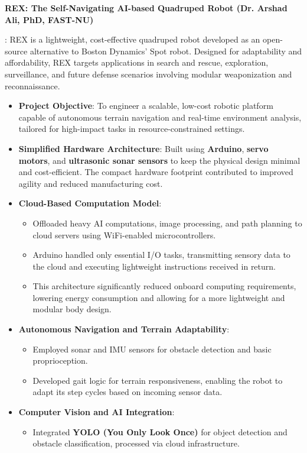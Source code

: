 \documentclass[letterpaper,10pt]{article}
\newcommand{\resumeItem}[2]{
  \item\small{
    \textbf{#1}{: #2 \vspace{-2pt}}
  }
}
\newcommand{\resumeSubItem}[2]{\resumeItem{#1}{#2}\vspace{-4pt}}
\begin{document}
\resumeSubItem{REX: The Self-Navigating AI-based Quadruped Robot (Dr. Arshad Ali, PhD, FAST-NU)}
{REX is a lightweight, cost-effective quadruped robot developed as an open-source alternative to Boston Dynamics’ Spot robot. Designed for adaptability and affordability, REX targets applications in search and rescue, exploration, surveillance, and future defense scenarios involving modular weaponization and reconnaissance.
\begin{itemize}
    \item \textbf{Project Objective}: To engineer a scalable, low-cost robotic platform capable of autonomous terrain navigation and real-time environment analysis, tailored for high-impact tasks in resource-constrained settings.
    \item \textbf{Simplified Hardware Architecture}: Built using \textbf{Arduino}, \textbf{servo motors}, and \textbf{ultrasonic sonar sensors} to keep the physical design minimal and cost-efficient. The compact hardware footprint contributed to improved agility and reduced manufacturing cost.
    \item \textbf{Cloud-Based Computation Model}:
    \begin{itemize}
        \item Offloaded heavy AI computations, image processing, and path planning to cloud servers using WiFi-enabled microcontrollers.
        \item Arduino handled only essential I/O tasks, transmitting sensory data to the cloud and executing lightweight instructions received in return.
        \item This architecture significantly reduced onboard computing requirements, lowering energy consumption and allowing for a more lightweight and modular body design.
    \end{itemize}
    \item \textbf{Autonomous Navigation and Terrain Adaptability}:
    \begin{itemize}
        \item Employed sonar and IMU sensors for obstacle detection and basic proprioception.
        \item Developed gait logic for terrain responsiveness, enabling the robot to adapt its step cycles based on incoming sensor data.
    \end{itemize}
    \item \textbf{Computer Vision and AI Integration}:
    \begin{itemize}
        \item Integrated \textbf{YOLO (You Only Look Once)} for object detection and obstacle classification, processed via cloud infrastructure.

\end{itemize}
\end{itemize}}
\end{document}
